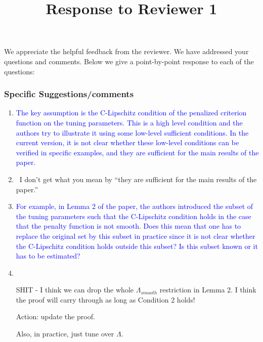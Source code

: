 \documentclass[]{article}
\title{Response to Reviewer 1}
\newcommand{\point}[1]{\item \textcolor{blue}{#1}}
\newcommand{\reply}{\item[]\ }
\begin{document}
	
	\maketitle
	
	We appreciate the helpful feedback from the reviewer. We have addressed your questions and comments. Below we give a point-by-point response to each of the questions:
	
	\subsubsection*{Specific Suggestions/comments}
	
	\begin{enumerate}
		\point{
			The key assumption is the C-Lipschitz condition of the penalized criterion function on the tuning parameters.  This is a high level condition and the authors try to illustrate it using some low-level sufficient conditions.
			In the current version, it is not clear whether these low-level conditions can be verified in specific examples, and they are sufficient for the main results of the paper.
		}
		\reply{I don't get what you mean by ``they are sufficient for the main results of the paper.''}
		
		\point{
			For example, in Lemma 2 of the paper, the authors introduced the subset of the tuning parameters such that the C-Lipschitz condition holds in the case that the penalty function is not smooth.
			Does this mean that one has to replace the original set by this subset in practice since it is not clear whether the C-Lipschitz condition holds outside this subset?
			Is this subset known or it has to be estimated?
		}
		\reply{
			
			SHIT - I think we can drop the whole $\Lambda_{smooth}$ restriction in Lemma 2. I think the proof will carry through as long as Condition 2 holds!
			
			Action: update the proof.
			
			Also, in practice, just tune over $\Lambda$.
		}
	

\end{enumerate}
\end{document}
